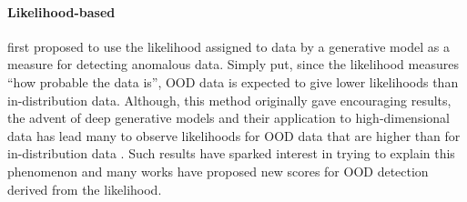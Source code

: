 
\paragraph{Likelihood-based}
%
\textcite{bishop_novelty_1994} first proposed to use the likelihood assigned to data by a generative model as a measure for detecting anomalous data. Simply put, since the likelihood measures ``how probable the data is'', OOD data is expected to give lower likelihoods than in-distribution data. Although, this method originally gave encouraging results, the advent of deep generative models and their application to high-dimensional data has lead many to observe likelihoods for OOD data that are higher than for in-distribution data \parencite{choi_waic_2019,nalisnick_detecting_2019,hendrycks_deep_2019,kirichenko_why_2020}. Such results have sparked interest in trying to explain this phenomenon and many works have proposed new scores for OOD detection derived from the likelihood. 

